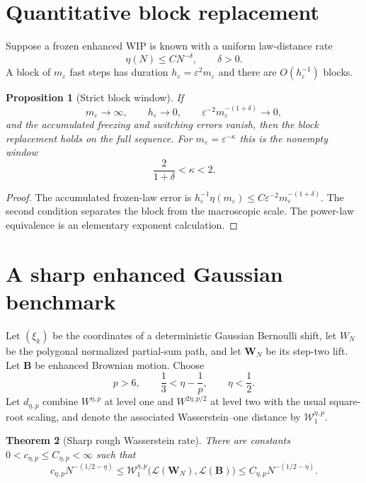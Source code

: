 \documentclass[11pt,reqno]{amsart}
\newtheorem{theorem}{Theorem}[section]
\newtheorem{proposition}[theorem]{Proposition}
\theoremstyle{definition}
\theoremstyle{remark}
\begin{document}
\section{Quantitative block replacement}\label{sec:block}

Suppose a frozen enhanced WIP is known with a uniform law-distance rate
\[
 \eta(N)\le CN^{-\delta},\qquad\delta>0.
\]
A block of $m_\varepsilon$ fast steps has duration
$h_\varepsilon=\varepsilon^2m_\varepsilon$ and there are
$O(h_\varepsilon^{-1})$ blocks.

\begin{proposition}[Strict block window]\label{prop:block}
If
\[
 m_\varepsilon\to\infty,\qquad
 h_\varepsilon\to0,\qquad
 \varepsilon^{-2}m_\varepsilon^{-(1+\delta)}\to0,
\]
and the accumulated freezing and switching errors vanish, then the block
replacement holds on the full sequence.  For
$m_\varepsilon=\varepsilon^{-\kappa}$ this is the nonempty window
\begin{equation}\label{eq:kappa-window}
 \frac{2}{1+\delta}<\kappa<2.
\end{equation}
\end{proposition}

\begin{proof}
The accumulated frozen-law error is
$h_\varepsilon^{-1}\eta(m_\varepsilon)
\le C\varepsilon^{-2}m_\varepsilon^{-(1+\delta)}$.
The second condition separates the block from the macroscopic scale.  The
power-law equivalence is an elementary exponent calculation.
\end{proof}

\section{A sharp enhanced Gaussian benchmark}\label{sec:rate}

Let $(\xi_k)$ be the coordinates of a deterministic Gaussian Bernoulli shift,
let $W_N$ be the polygonal normalized partial-sum path, and let
$\mathbf W_N$ be its step-two lift.  Let $\mathbf B$ be enhanced Brownian
motion.  Choose
\begin{equation}\label{eq:rough-window}
 p>6,\qquad \frac13<\eta-\frac1p,\qquad \eta<\frac12.
\end{equation}
Let $d_{\eta,p}$ combine $W^{\eta,p}$ at level one and
$W^{2\eta,p/2}$ at level two with the usual square-root scaling, and denote the
associated Wasserstein--one distance by $\mathcal W_1^{\eta,p}$.

\begin{theorem}[Sharp rough Wasserstein rate]\label{thm:rate}
There are constants $0<c_{\eta,p}\le C_{\eta,p}<\infty$ such that
\[
 c_{\eta,p}N^{-(1/2-\eta)}
 \le\mathcal W_1^{\eta,p}
 \bigl(\mathcal L(\mathbf W_N),\mathcal L(\mathbf B)\bigr)
 \le C_{\eta,p}N^{-(1/2-\eta)}.
\]
\end{theorem}
\end{document}
